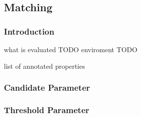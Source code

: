 \subsection{Matching}
\label{subsec_evaluation_matching}

\subsubsection{Introduction}
what is evaluated TODO
enviroment TODO

list of annotated properties 

\subsubsection{Candidate Parameter}
\subsubsection{Threshold Parameter}